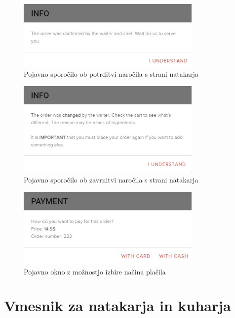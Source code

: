 \documentclass[a4paper, 12pt]{book}
\begin{document}
\begin{figure}[!htb]
\begin{center}
\includegraphics[width=9cm]{gost_6.jpg}
\caption{Pojavno sporočilo ob potrditvi naročila s strani natakarja}
\label{Gost_6}
\end{center}
\end{figure}

\begin{figure}[!htb]
\begin{center}
\includegraphics[width=9cm]{gost_8.jpg}
\caption{Pojavno sporočilo ob zavrnitvi naročila s strani natakarja}
\label{Gost_8}
\end{center}
\end{figure}


\begin{figure}[!htb]
\begin{center}
\includegraphics[width=9cm]{gost_7.jpg}
\caption{Pojavno okno z možnostjo izbire načina plačila}
\label{Gost_7}
\end{center}
\end{figure}


\section{Vmesnik za natakarja in kuharja}
\end{document}
